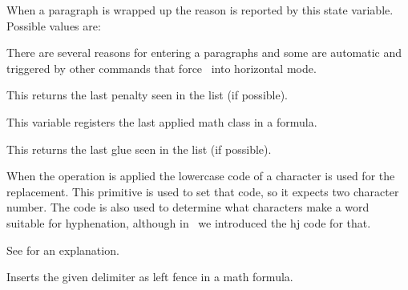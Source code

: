 \startnewprimitive[title={\prm {lastparcontext}}]

When a paragraph is wrapped up the reason is reported by this state variable.
Possible values are:

\startfourrows
{}
\stopfourrows

\stopnewprimitive

\startnewprimitive[title={\prm {lastpartrigger}}]

There are several reasons for entering a paragraphs and some are automatic and
triggered by other commands that force \TEX\ into horizontal mode.

\startfourrows
{}
\stopfourrows

\stopnewprimitive

\startoldprimitive[title={\prm {lastpenalty}}]

This returns the last penalty seen in the list (if possible).

\stopoldprimitive

\startnewprimitive[title={\prm {lastrightclass}}]

This variable registers the last applied math class in a formula.

\stopnewprimitive

\startoldprimitive[title={\prm {lastskip}}]

This returns the last glue seen in the list (if possible).

\stopoldprimitive

\startoldprimitive[title={\prm {lccode}}]

When the  operation is applied the lowercase code of a character
is used for the replacement. This primitive is used to set that code, so it
expects two character number. The code is also used to determine what characters
make a word suitable for hyphenation, although in \LUATEX\ we introduced the \prm
{hj} code for that.

\stopoldprimitive

\startoldprimitive[title={\prm {leaders}}]

See  for an explanation.

\stopoldprimitive

\startoldprimitive[title={\prm {left}}]

Inserts the given delimiter as left fence in a math formula.

\stopoldprimitive

\startoldprimitive[title={\prm {lefthyphenmin}}]

